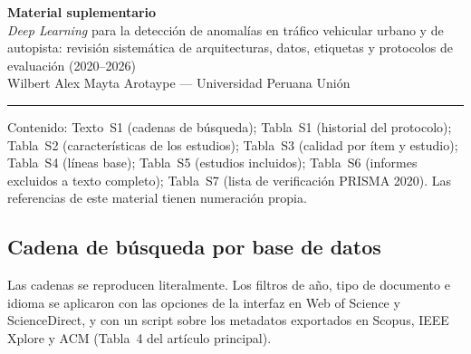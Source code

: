 \documentclass[12pt, a4paper]{article}
\begin{document}
\begin{center}
  {\Large\bfseries\color{azulPrincipal} Material suplementario}\\[0.6em]
  {\normalsize\textit{Deep Learning} para la detección de anomalías en tráfico vehicular urbano y de autopista: revisión sistemática de arquitecturas, datos, etiquetas y protocolos de evaluación (2020--2026)}\\[0.6em]
  {\small Wilbert Alex Mayta Arotaype --- Universidad Peruana Unión}
\end{center}
\noindent\rule{\linewidth}{1pt}

Contenido: Texto~S1 (cadenas de búsqueda); Tabla~S1 (historial del protocolo); Tabla~S2 (características de los estudios); Tabla~S3 (calidad por ítem y estudio); Tabla~S4 (líneas base); Tabla~S5 (estudios incluidos); Tabla~S6 (informes excluidos a texto completo); Tabla~S7 (lista de verificación PRISMA 2020). Las referencias de este material tienen numeración propia.

\subsection*{Cadena de b\'{u}squeda por base de datos}

Las cadenas se reproducen literalmente. Los filtros de a\~{n}o, tipo de documento e idioma se aplicaron con las opciones de la interfaz en Web of Science y ScienceDirect, y con un script sobre los metadatos exportados en Scopus, IEEE Xplore y ACM (Tabla~4 del artículo principal).
\end{document}
